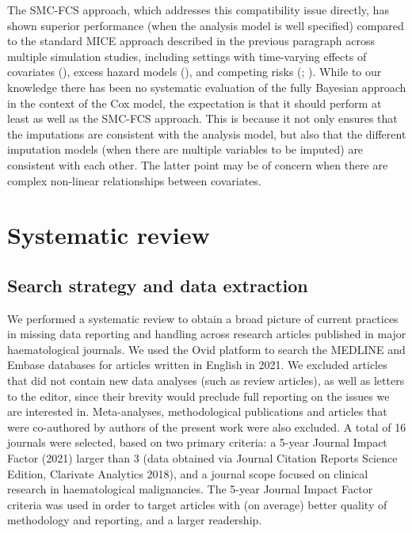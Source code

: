 \documentclass[
  letterpaper,
  paper=240mm:170mm,
  twoside=true,
  open=right,
  fontsize=10pt,
  pagesize=false,
  BCOR=15mm,
  DIV=14,
  headinclude=true,
  footinclude=false,
  headsepline=on]{scrbook}
\begin{document}
The SMC-FCS approach, which addresses this compatibility issue directly,
has shown superior performance (when the analysis model is well
specified) compared to the standard MICE approach described in the
previous paragraph across multiple simulation studies, including
settings with time-varying effects of covariates
(),
excess hazard models
(), and competing risks
(;
). While to our knowledge there has been no
systematic evaluation of the fully Bayesian approach in the context of
the Cox model, the expectation is that it should perform at least as
well as the SMC-FCS approach. This is because it not only ensures that
the imputations are consistent with the analysis model, but also that
the different imputation models (when there are multiple variables to be
imputed) are consistent with each other. The latter point may be of
concern when there are complex non-linear relationships between
covariates.

\section{Systematic review}\label{systematic-review}

\subsection{Search strategy and data
extraction}\label{search-strategy-and-data-extraction}

We performed a systematic review to obtain a broad picture of current
practices in missing data reporting and handling across research
articles published in major haematological journals. We used the Ovid
platform to search the MEDLINE and Embase databases for articles written
in English in 2021. We excluded articles that did not contain new data
analyses (such as review articles), as well as letters to the editor,
since their brevity would preclude full reporting on the issues we are
interested in. Meta-analyses, methodological publications and articles
that were co-authored by authors of the present work were also excluded.
A total of 16 journals were selected, based on two primary criteria: a
5-year Journal Impact Factor (2021) larger than 3 (data obtained via
Journal Citation Reports Science Edition, Clarivate Analytics 2018), and
a journal scope focused on clinical research in haematological
malignancies. The 5-year Journal Impact Factor criteria was used in
order to target articles with (on average) better quality of methodology
and reporting, and a larger readership.
\end{document}
